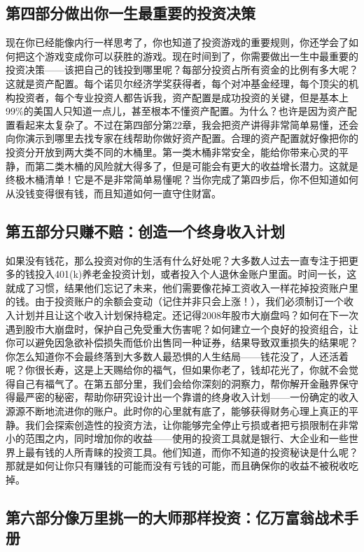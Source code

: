 \subsection{第四部分\q 做出你一生最重要的投资决策}

现在你已经能像内行一样思考了，你也知道了投资游戏的重要规则，你还学会了如何把这个游戏变成你可以获胜的游戏。现在时间到了，你需要做出一生中最重要的投资决策——该把自己的钱投到哪里呢？每部分投资占所有资金的比例有多大呢？这就是资产配置。每个诺贝尔经济学奖获得者，每个对冲基金经理，每个顶尖的机构投资者，每个专业投资人都告诉我，资产配置是成功投资的关键，但是基本上99\%的美国人只知道一点儿，甚至根本不懂资产配置。为什么？也许是因为资产配置看起来太复杂了。不过在第四部分第22章，我会把资产讲得非常简单易懂，还会向你演示到哪里去找专家在线帮助你做好资产配置。合理的资产配置就好像把你的投资分开放到两大类不同的木桶里。第一类木桶非常安全，能给你带来心灵的平静，而第二类木桶的风险就大得多了，但是可能会有更大的收益增长潜力。这就是终极木桶清单！它是不是非常简单易懂呢？当你完成了第四步后，你不但知道如何从没钱变得很有钱，而且知道如何一直守住财富。

\subsection{第五部分\q 只赚不赔：创造一个终身收入计划}

如果没有钱花，那么投资对你的生活有什么好处呢？大多数人过去一直专注于把更多的钱投入401(k)养老金投资计划，或者投入个人退休金账户里面。时间一长，这就成了习惯，结果他们忘记了未来，他们需要像花掉工资收入一样花掉投资账户里的钱。由于投资账户的余额会变动（记住并非只会上涨！），我们必须制订一个收入计划并且让这个收入计划保持稳定。还记得2008年股市大崩盘吗？如何在下一次遇到股市大崩盘时，保护自己免受重大伤害呢？如何建立一个良好的投资组合，让你可以避免因急欲补偿损失而低价出售同一种证券，结果导致双重损失的结果呢？你怎么知道你不会最终落到大多数人最恐惧的人生结局——钱花没了，人还活着呢？你很长寿，这是上天赐给你的福气，但如果你老了，钱却花光了，你就不会觉得自己有福气了。在第五部分里，我们会给你深刻的洞察力，帮你解开金融界保守得最严密的秘密，帮助你研究设计出一个靠谱的终身收入计划——一份确定的收入源源不断地流进你的账户。此时你的心里就有底了，能够获得财务心理上真正的平静。我们会探索创造性的投资方法，让你能够完全停止亏损或者把亏损限制在非常小的范围之内，同时增加你的收益——使用的投资工具就是银行、大企业和一些世界上最有钱的人所青睐的投资工具。他们知道，而你不知道的投资秘诀是什么呢？那就是如何让你只有赚钱的可能而没有亏钱的可能，而且确保你的收益不被税收吃掉。

\subsection{第六部分\q 像万里挑一的大师那样投资：亿万富翁战术手册}


